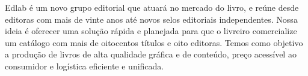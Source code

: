 \blankpage

\pagestyle{indice}

\vspace*{.5cm}

{}

\vspace{.5cm}

{}


\hspace*{-7cm}\hrulefill\hspace*{-7cm}

\vspace{1cm}

\hspace*{-.5cm}\parbox{150pt}{\raggedright Edlab é um novo grupo editorial que atuará no mercado do livro, e reúne desde editoras com mais de vinte anos até novos selos editoriais independentes. Nossa ideia é oferecer uma solução rápida e planejada para que o livreiro comercialize um catálogo com mais de oitocentos títulos e oito editoras. Temos como objetivo a produção de livros de alta qualidade gráfica e de conteúdo, preço acessível ao consumidor e logística eficiente e unificada.} %

